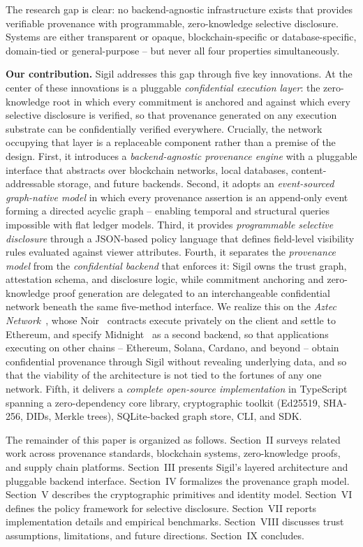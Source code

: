 \documentclass[conference]{IEEEtran}
\begin{document}
The research gap is clear: no backend-agnostic infrastructure exists that
provides verifiable provenance with programmable, zero-knowledge selective
disclosure.  Systems are either transparent or opaque, blockchain-specific or
database-specific, domain-tied or general-purpose -- but never all four
properties simultaneously.

\textbf{Our contribution.} Sigil addresses this gap through five key
innovations.  At the center of these innovations is a pluggable
\emph{confidential execution layer}: the zero-knowledge root in which every
commitment is anchored and against which every selective disclosure is
verified, so that provenance generated on any execution substrate can be
confidentially verified everywhere.  Crucially, the network occupying that
layer is a replaceable component rather than a premise of the design.  First, it
introduces a \emph{backend-agnostic provenance engine}
with a pluggable interface that abstracts over blockchain networks, local
databases, content-addressable storage, and future backends.  Second, it
adopts an \emph{event-sourced graph-native model} in which every provenance
assertion is an append-only event forming a directed acyclic graph -- enabling
temporal and structural queries impossible with flat ledger models.  Third, it
provides \emph{programmable selective disclosure} through a JSON-based policy
language that defines field-level visibility rules evaluated against viewer
attributes.  Fourth, it separates the \emph{provenance model} from the
\emph{confidential backend} that enforces it: Sigil owns the trust graph,
attestation schema, and disclosure logic, while commitment anchoring and
zero-knowledge proof generation are delegated to an interchangeable
confidential network beneath the same five-method interface.  We realize this
on the \emph{Aztec Network}~\cite{aztec2023}, whose Noir~\cite{noir2023}
contracts execute privately on the client and settle to Ethereum, and specify
Midnight~\cite{midnight2023} as a second backend, so that applications
executing on other chains -- Ethereum, Solana, Cardano, and beyond -- obtain
confidential provenance through Sigil without revealing underlying data, and so
that the viability of the architecture is not tied to the fortunes of any one
network.  Fifth, it
delivers a \emph{complete open-source implementation} in TypeScript spanning a
zero-dependency core library, cryptographic toolkit (Ed25519, SHA-256, DIDs,
Merkle trees), SQLite-backed graph store, CLI, and SDK.

The remainder of this paper is organized as follows.  Section~II surveys
related work across provenance standards, blockchain systems, zero-knowledge
proofs, and supply chain platforms.  Section~III presents Sigil's layered
architecture and pluggable backend interface.  Section~IV formalizes the
provenance graph model.  Section~V describes the cryptographic primitives and
identity model.  Section~VI defines the policy framework for selective
disclosure.  Section~VII reports implementation details and empirical
benchmarks.  Section~VIII discusses trust assumptions, limitations, and future
directions.  Section~IX concludes.
\end{document}
